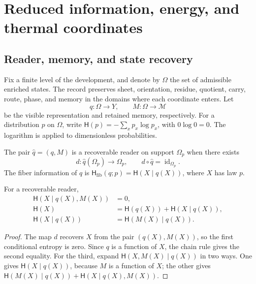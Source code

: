 \section{Reduced information, energy, and thermal coordinates}
\subsection{Reader, memory, and state recovery}

Fix a finite level of the development, and denote by \(\Omega\) the
set of admissible enriched states. The record preserves sheet,
orientation, residue, quotient, carry, route, phase, and memory in the
domains where each coordinate enters. Let
\[
 q:\Omega\longrightarrow Y,\qquad
 M:\Omega\longrightarrow\mathcal M
\]
be the visible representation and retained memory, respectively. For a
distribution \(p\) on \(\Omega\), write
\(\mathsf H(p)=-\sum_xp_x\log p_x\), with \(0\log0=0\).
The logarithm is applied to dimensionless probabilities.

\begin{definition}
The pair \(\widehat q=(q,M)\) is a recoverable reader on support
\(\Omega_p\) when there exists
\[
 d:\widehat q(\Omega_p)\longrightarrow\Omega_p,
 \qquad d\circ\widehat q=\operatorname{id}_{\Omega_p}.
\]
The fiber information of \(q\) is
\(\mathsf H_{\mathrm{fib}}(q;p)=\mathsf H(X\mid q(X))\), where
\(X\) has law \(p\).
\end{definition}

\begin{proposition}
For a recoverable reader,
\begin{align}
 \mathsf H(X\mid q(X),M(X))&=0,\\
 \mathsf H(X)&=\mathsf H(q(X))+\mathsf H(X\mid q(X)),\\
 \mathsf H(X\mid q(X))&=\mathsf H(M(X)\mid q(X)).
 \label{eq:ii-kb-aut-fibra}
\end{align}
\end{proposition}
\begin{proof}
The map \(d\) recovers \(X\) from the pair \((q(X),M(X))\),
so the first conditional entropy is zero. Since \(q\) is
a function of \(X\), the chain rule gives the second equality.
For the third, expand
\(\mathsf H(X,M(X)\mid q(X))\) in two ways. One gives
\(\mathsf H(X\mid q(X))\), because \(M\) is a function of \(X\);
the other gives
\(\mathsf H(M(X)\mid q(X))+\mathsf H(X\mid q(X),M(X))\).
\end{proof}


